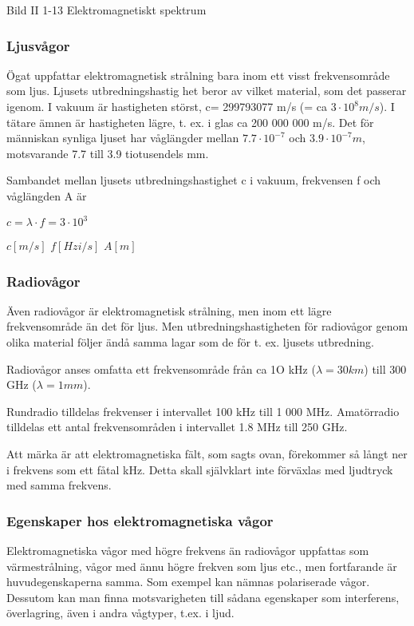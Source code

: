 \documentclass[a4paper,twoside,twocolumn,openright]{book}
\begin{document}
Bild II 1-13 Elektromagnetiskt spektrum

\subsubsection{Ljusvågor}

Ögat uppfattar elektromagnetisk strålning bara inom ett visst frekvensområde som ljus.
Ljusets utbredningshastig het beror av vilket material, som det passerar igenom. I
vakuum är hastigheten störst, c= 299793077 m/s (= ca $3 \cdot 10^8 m/s$). I tätare ämnen är
hastigheten lägre, t. ex. i glas ca 200 000 000 m/s. Det för människan synliga ljuset har
våglängder mellan $7.7 \cdot 10^{-7}$ och $3.9 \cdot 10^{-7} m$, motsvarande 7.7 till 3.9
tiotusendels mm.

Sambandet mellan ljusets utbredningshastighet c i vakuum, frekvensen f och våglängden A är

$c = \lambda \cdot f = 3 \cdot 10^3$

$c [m/s]$ $f [Hz  i/s]$ $A [m]$

\subsubsection{Radiovågor}

Även radiovågor är elektromagnetisk strålning, men inom ett lägre frekvensområde än
det för ljus. Men utbredningshastigheten för radiovågor genom olika material följer ändå
samma lagar som de för t. ex. ljusets utbredning.

Radiovågor anses omfatta ett frekvensområde från ca 1O kHz ($\lambda = 30 km$) till 300
GHz ($\lambda = 1 mm$).

Rundradio tilldelas frekvenser i intervallet 100 kHz till 1 000 MHz. Amatörradio tilldelas
ett antal frekvensområden i intervallet 1.8 MHz till 250 GHz.

Att märka är att elektromagnetiska fält, som sagts ovan, förekommer så långt ner i
frekvens som ett fåtal kHz. Detta skall självklart inte förväxlas med ljudtryck med samma
frekvens.

\subsubsection{Egenskaper hos elektromagnetiska vågor}

Elektromagnetiska vågor med högre frekvens än radiovågor uppfattas som värmestrålning,
vågor med ännu högre frekven som ljus etc., men fortfarande är huvudegenskaperna samma.
Som exempel kan nämnas polariserade vågor. Dessutom kan
man finna motsvarigheten till sådana egenskaper som interferens, överlagring, även i
andra vågtyper, t.ex. i ljud.
\end{document}
